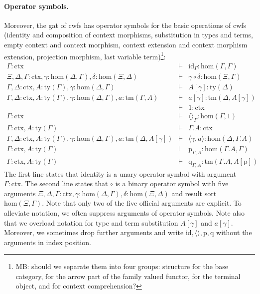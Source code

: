 \documentclass[11pt,a4paper]{article}
\theoremstyle{definition}
\newcommand{\id}{\mathsf{id}}
\def\Hom{\mathrm{hom}}
\def\id{\mathrm{id}}
\newcommand{\ctx}{\mathrm{ctx}}
\newcommand{\ty}{\mathrm{ty}}
\newcommand{\tm}{\mathrm{tm}}
\newcommand{\tuple}[1]{\langle #1 \rangle}
\newcommand{\cext}{.}
\def\p{\mathrm{p}}
\def\q{\mathrm{q}}
\begin{document}
\paragraph{Operator symbols.}
Moreover, the gat of cwfs has operator symbols for the basic operations of cwfs (identity and composition of context morphisms, substitution in types and terms, empty context and context morphism, context extension and context morphism extension, projection morphism, last variable term)\footnote{MB: should we separate them into four groups: structure for the base category, for the arrow part of the family valued functor, for the terminal object, and for context comprehension?}: 
\begin{eqnarray*}
\Gamma : \ctx &\vdash& \id_{\Gamma} : \Hom(\Gamma,\Gamma)\\
\Xi,\Delta,\Gamma : \ctx, \gamma : \Hom(\Delta,\Gamma), \delta : \Hom(\Xi,\Delta) &\vdash&
\gamma \circ \delta : \Hom(\Xi,\Gamma)\\
\Gamma,\Delta : \ctx, A:\ty(\Gamma), \gamma : \Hom(\Delta,\Gamma) &\vdash&
A[\gamma] : \ty(\Delta)\\
\Gamma,\Delta : \ctx, A:\ty(\Gamma), \gamma : \Hom(\Delta,\Gamma), a:\tm(\Gamma,A) &\vdash&  a[\gamma] : \tm(\Delta,A[\gamma])\\
&\vdash& 1 : \ctx\\
\Gamma : \ctx &\vdash& \tuple{}_\Gamma : \Hom(\Gamma,1)\\
\Gamma : \ctx, A:\ty(\Gamma) &\vdash& \Gamma\cext A : \ctx\\
\Gamma,\Delta : \ctx, A:\ty(\Gamma), \gamma : \Hom(\Delta,\Gamma), a:\tm(\Delta,A[\gamma]) &\vdash& \tuple{\gamma,a} : \Hom(\Delta,\Gamma\cext A)\\
\Gamma : \ctx, A:\ty(\Gamma) &\vdash& \p_{\Gamma,A}: \Hom(\Gamma\cext A,\Gamma)\\
\Gamma : \ctx, A:\ty(\Gamma) &\vdash& \q_{\Gamma,A}: \tm(\Gamma\cext A,A[\p])
\end{eqnarray*}
The first line states that identity is a unary operator symbol with argument $\Gamma : \ctx$. The second line states that $\circ$ is a binary operator symbol with five arguments $\Xi,\Delta,\Gamma : \ctx, \gamma : \Hom(\Delta,\Gamma), \delta : \Hom(\Xi,\Delta)$ and result sort $\Hom(\Xi,\Gamma)$. Note that only two of the five official arguments are explicit. To alleviate notation, we often suppress arguments of operator symbols. Note also that we overload notation for type and term substitution $A[\gamma]$ and $a[\gamma]$. Moreover, we sometimes drop further arguments and write $\id, \tuple{},\p,\q$ without the arguments in index position.
\end{document}
